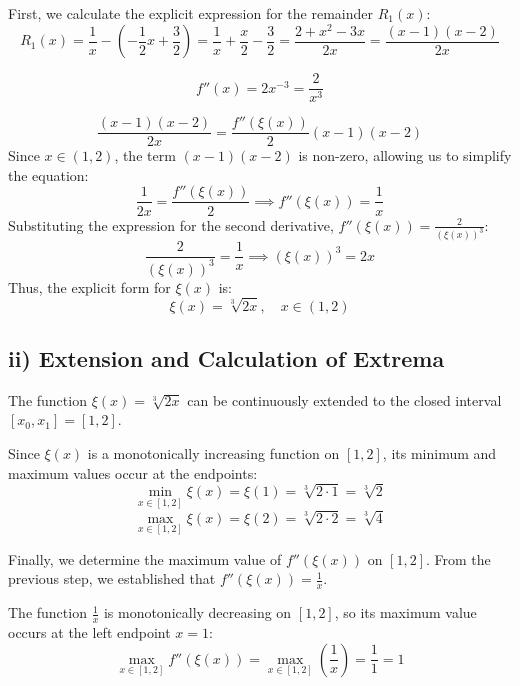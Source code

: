 \documentclass[a4paper]{article}
\begin{document}
First, we calculate the explicit expression for the remainder $R_1(x)$:
\[
R_1(x) = \frac{1}{x} - \left(-\frac{1}{2}x + \frac{3}{2}\right) = \frac{1}{x} + \frac{x}{2} - \frac{3}{2} = \frac{2 + x^2 - 3x}{2x} = \frac{(x-1)(x-2)}{2x}
\]

\[
f''(x) = 2x^{-3} = \frac{2}{x^3}
\]

\[
\frac{(x-1)(x-2)}{2x} = \frac{f''(\xi(x))}{2}(x - 1)(x - 2)
\]
Since $x \in (1, 2)$, the term $(x-1)(x-2)$ is non-zero, allowing us to simplify the equation:
\[
\frac{1}{2x} = \frac{f''(\xi(x))}{2} \implies f''(\xi(x)) = \frac{1}{x}
\]
Substituting the expression for the second derivative, $f''(\xi(x)) = \frac{2}{(\xi(x))^3}$:
\[
\frac{2}{(\xi(x))^3} = \frac{1}{x} \implies (\xi(x))^3 = 2x
\]
Thus, the explicit form for $\xi(x)$ is:
\[
\xi(x) = \sqrt[3]{2x}, \quad x \in (1, 2)
\]

\subsection*{ii) Extension and Calculation of Extrema}

The function $\xi(x) = \sqrt[3]{2x}$ can be continuously extended to the closed interval $[x_0, x_1] = [1, 2]$.

Since $\xi(x)$ is a monotonically increasing function on $[1, 2]$, its minimum and maximum values occur at the endpoints:
\[
\min_{x \in [1, 2]} \xi(x) = \xi(1) = \sqrt[3]{2 \cdot 1} = \sqrt[3]{2}
\]
\[
\max_{x \in [1, 2]} \xi(x) = \xi(2) = \sqrt[3]{2 \cdot 2} = \sqrt[3]{4}
\]

Finally, we determine the maximum value of $f''(\xi(x))$ on $[1, 2]$. From the previous step, we established that $f''(\xi(x)) = \frac{1}{x}$.

The function $\frac{1}{x}$ is monotonically decreasing on $[1, 2]$, so its maximum value occurs at the left endpoint $x=1$:
\[
\max_{x \in [1, 2]} f''(\xi(x)) = \max_{x \in [1, 2]} \left(\frac{1}{x}\right) = \frac{1}{1} = 1
\]
\end{document}
